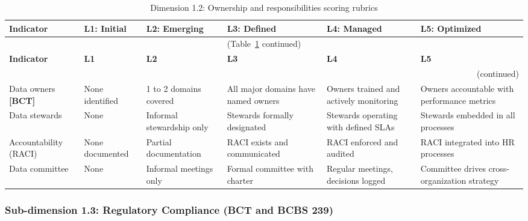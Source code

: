\begin{center}
{\small
\begin{longtable}{|p{2.4cm}|p{2.0cm}|p{2.0cm}|p{2.2cm}|p{2.2cm}|p{2.2cm}|}
\caption{Dimension 1.2: Ownership and responsibilities scoring rubrics}\label{tab:d1-2}\\

\hline
\textbf{Indicator} & \textbf{L1: Initial} & \textbf{L2: Emerging} & \textbf{L3: Defined} & \textbf{L4: Managed} & \textbf{L5: Optimized} \\
\hline
\endfirsthead
\multicolumn{6}{c}{\small (Table~\ref{tab:d1-2} continued)} \\
\hline
\textbf{Indicator} & \textbf{L1} & \textbf{L2} & \textbf{L3} & \textbf{L4} & \textbf{L5} \\
\hline
\endhead
\hline
\multicolumn{6}{r}{\small (continued)} \\
\endfoot
\hline
\endlastfoot
Data owners \textbf{[BCT]} &
  None identified &
  1 to 2 domains covered &
  All major domains have named owners &
  Owners trained and actively monitoring &
  Owners accountable with performance metrics \\
\hline
Data stewards &
  None &
  Informal stewardship only &
  Stewards formally designated &
  Stewards operating with defined SLAs &
  Stewards embedded in all processes \\
\hline
Accountability (RACI) &
  None documented &
  Partial documentation &
  RACI exists and communicated &
  RACI enforced and audited &
  RACI integrated into HR processes \\
\hline
Data committee &
  None &
  Informal meetings only &
  Formal committee with charter &
  Regular meetings, decisions logged &
  Committee drives cross-organization strategy \\
\hline
\end{longtable}
}
\end{center}

\subsubsection*{Sub-dimension 1.3: Regulatory Compliance (BCT and BCBS 239)}

